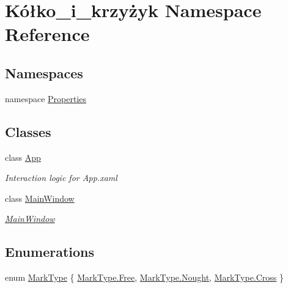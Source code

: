\hypertarget{namespace_k_xC3_xB3_xC5_x82ko__i__krzy_xC5_xBCyk}{}\section{Kółko\+\_\+i\+\_\+krzyżyk Namespace Reference}
\label{namespace_k_xC3_xB3_xC5_x82ko__i__krzy_xC5_xBCyk}
\subsection*{Namespaces}
\begin{DoxyCompactItemize}
\item 
namespace \hyperlink{namespace_k_xC3_xB3_xC5_x82ko__i__krzy_xC5_xBCyk_1_1_properties}{Properties}
\end{DoxyCompactItemize}
\subsection*{Classes}
\begin{DoxyCompactItemize}
\item 
class \hyperlink{class_k_xC3_xB3_xC5_x82ko__i__krzy_xC5_xBCyk_1_1_app}{App}
\begin{DoxyCompactList}\small\item\em Interaction logic for App.\+xaml \end{DoxyCompactList}\item 
class \hyperlink{class_k_xC3_xB3_xC5_x82ko__i__krzy_xC5_xBCyk_1_1_main_window}{Main\+Window}
\begin{DoxyCompactList}\small\item\em \hyperlink{class_k_xC3_xB3_xC5_x82ko__i__krzy_xC5_xBCyk_1_1_main_window}{Main\+Window} \end{DoxyCompactList}\end{DoxyCompactItemize}
\subsection*{Enumerations}
\begin{DoxyCompactItemize}
\item 
enum \hyperlink{namespace_k_xC3_xB3_xC5_x82ko__i__krzy_xC5_xBCyk_a116fbaf64fe89700fb48d51b83b2093b}{Mark\+Type} \{ \hyperlink{namespace_k_xC3_xB3_xC5_x82ko__i__krzy_xC5_xBCyk_a116fbaf64fe89700fb48d51b83b2093bab24ce0cd392a5b0b8dedc66c25213594}{Mark\+Type.\+Free}, 
\hyperlink{namespace_k_xC3_xB3_xC5_x82ko__i__krzy_xC5_xBCyk_a116fbaf64fe89700fb48d51b83b2093baf0feddad004d9c7e87944b81d581a911}{Mark\+Type.\+Nought}, 
\hyperlink{namespace_k_xC3_xB3_xC5_x82ko__i__krzy_xC5_xBCyk_a116fbaf64fe89700fb48d51b83b2093bae76b449b9fc8536af7557ffa6321d269}{Mark\+Type.\+Cross}
 \}
\end{DoxyCompactItemize}


